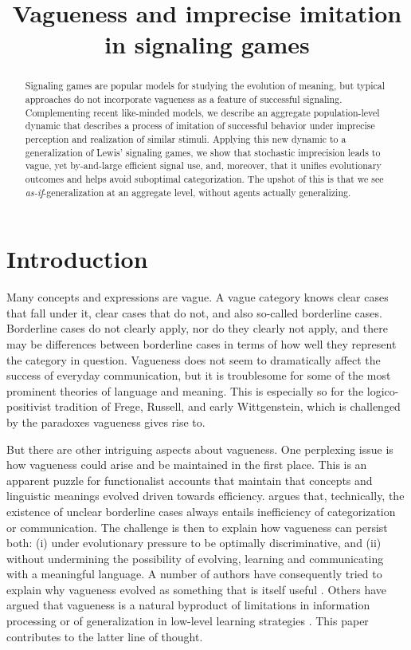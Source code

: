 \documentclass[fleqn,reqno,10pt]{article}
\title{Vagueness and imprecise imitation in signaling games}
\date{}
\begin{document}
\maketitle

\begin{abstract}
  Signaling games are popular models for studying the evolution of meaning, but typical
  approaches do not incorporate vagueness as a feature of successful signaling.  Complementing
  recent like-minded models, we describe an aggregate population-level dynamic that describes a
  process of imitation of successful behavior under imprecise perception and realization of
  similar stimuli. Applying this new dynamic to a generalization of Lewis' signaling games, we
  show that stochastic imprecision leads to vague, yet by-and-large efficient signal use, and,
  moreover, that it unifies evolutionary outcomes and helps avoid suboptimal
  categorization. The upshot of this is that we see \emph{as-if}-generalization at an aggregate
  level, without agents actually generalizing.
\end{abstract}

\section{Introduction}
\label{sec:introduction}

Many concepts and expressions are vague. A vague category knows clear cases that fall under it,
clear cases that do not, and also so-called borderline cases. Borderline cases do not clearly
apply, nor do they clearly not apply, and there may be differences between borderline cases in
terms of how well they represent the category in question. Vagueness does not seem to
dramatically affect the success of everyday communication, but it is troublesome for some of
the most prominent theories of language and meaning. This is especially so for the
logico-positivist tradition of Frege, Russell, and early Wittgenstein, which is challenged by
the paradoxes vagueness gives rise to.

But there are other intriguing aspects about vagueness. One perplexing issue is how vagueness
could arise and be maintained in the first place. This is an apparent puzzle for functionalist
accounts that maintain that concepts and linguistic meanings evolved driven towards
efficiency. \citet{Lipman2009:Why-is-Language} argues that, technically, the existence of unclear borderline cases always entails inefficiency of
categorization or communication. The challenge is then to explain how
vagueness can persist both: (i) under evolutionary pressure to be optimally discriminative, and (ii) without
undermining the possibility of evolving, learning and communicating with a meaningful
language. A number of authors have consequently tried to explain why vagueness evolved as
something that is itself useful
\citep[e.g.][]{Jaegherde-Jaegher2003:A-Game-Theoreti,Deemter2009:Utility-and-Lan,BlumeBoard2013:Intentional-Vag}.
Others have argued that vagueness is a natural byproduct of limitations in information
processing \citep[e.g.][]{FrankeJager2010:Vagueness-Signa} or of generalization in low-level
learning strategies \citep[e.g.][]{OConnor2013:The-Evolution-o}. This paper contributes to the
latter line of thought.
\end{document}
